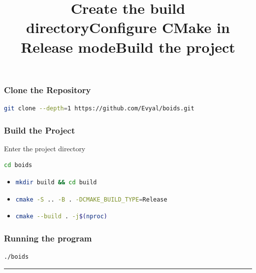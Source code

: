 \documentclass[10pt,a4paper]{article}
\begin{document}
\subsubsection{Clone the Repository}

\begin{lstlisting}[style=codecolour, language=bash]
git clone --depth=1 https://github.com/Evyal/boids.git
\end{lstlisting}

\subsubsection{Build the Project}

Enter the project directory

\begin{lstlisting}[style=codecolour, language=bash]
cd boids
\end{lstlisting}

\begin{itemize}
    \item \title{\textbf{Create the build directory}}

\begin{lstlisting}[style=codecolour, language=bash]
mkdir build && cd build
\end{lstlisting}

\item \title{\textbf{Configure CMake in Release mode}}

\begin{lstlisting}[style=codecolour, language=bash]
cmake -S .. -B . -DCMAKE_BUILD_TYPE=Release
\end{lstlisting}

\item \title{\textbf{Build the project}} 

\begin{lstlisting}[style=codecolour, language=bash]
cmake --build . -j$(nproc)
\end{lstlisting}
\end{itemize}


\subsubsection{Running the program} 

\begin{lstlisting}[style=codecolour, language=bash]
./boids
\end{lstlisting}

\par\noindent\rule{\textwidth}{0.4pt}
\end{document}
